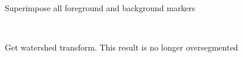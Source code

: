 \documentclass[12pt]{article}
\theoremstyle{plain}%
\theoremstyle{definition}
\theoremstyle{remark}
\begin{document}
\begin{figure}[!h]
\centering
\mbox{\quad
{}}
\caption{Superimpose all foreground and background markers}
\end{figure}
\begin{figure}[!h]
\centering
\mbox{\quad
{}}
\caption{Get watershed transform. This result is no longer oversegmented}
\end{figure}
\end{document}
